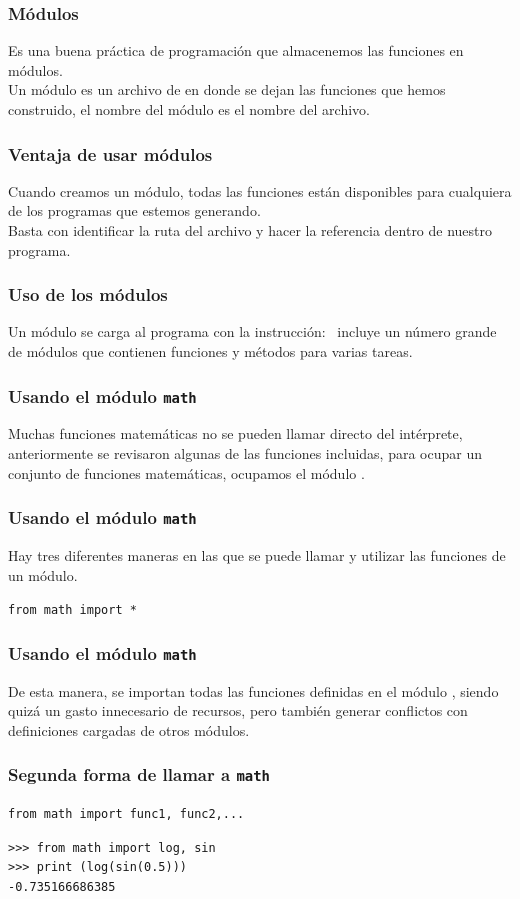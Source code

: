 \documentclass[12pt]{beamer}
\begin{document}
\begin{frame}[fragile]
\frametitle{Módulos}
Es una buena práctica de programación que almacenemos las funciones en módulos.
\\
\bigskip
\pause
Un módulo es un archivo de \python{} en donde se dejan las funciones que hemos construido, el nombre del módulo es el nombre del archivo.
\end{frame}
\begin{frame}
\frametitle{Ventaja de usar módulos}
Cuando creamos un módulo, todas las funciones están disponibles para cualquiera de los programas que estemos generando.
\\
\bigskip
\pause
Basta con identificar la ruta del archivo y hacer la referencia dentro de nuestro programa.
\end{frame}
\begin{frame}[fragile]
\frametitle{Uso de los módulos}
Un módulo se carga al programa con la instrucción:
\pause
{}
\python\ incluye un número grande de módulos que contienen funciones y métodos para varias tareas. 
\end{frame}
\begin{frame}[fragile]
\frametitle{Usando el módulo \texttt{math}}
Muchas funciones matemáticas no se pueden llamar directo del intérprete, \pause anteriormente se revisaron algunas de las funciones incluidas, \pause para ocupar un conjunto de funciones matemáticas, ocupamos el módulo .
\end{frame}
\begin{frame}[fragile]
\frametitle{Usando el módulo \texttt{math}}
Hay tres diferentes maneras en las que se puede llamar y utilizar las funciones de un módulo.
\begin{exampleblock}{}
\verb|from math import *|
\end{exampleblock}
\end{frame}
\begin{frame}
\frametitle{Usando el módulo \texttt{math}}
De esta manera, se importan todas las funciones definidas en el módulo , siendo quizá un gasto innecesario de recursos, pero también generar conflictos con definiciones cargadas de otros módulos.
\end{frame}
\begin{frame}[fragile]
\frametitle{Segunda forma de llamar a \texttt{math}}
\begin{exampleblock}{}
\verb|from math import func1, func2,...|
\end{exampleblock}
\pause
\begin{exampleblock}{}
\verb|>>> from math import log, sin| \\
\verb|>>> print (log(sin(0.5)))| \\
\verb|-0.735166686385|
\end{exampleblock}
\end{frame}
\end{document}
